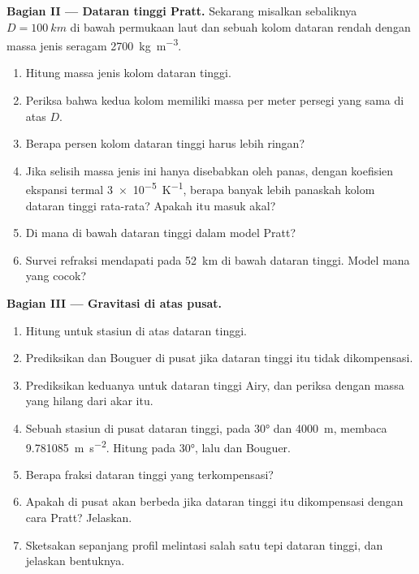 \begin{problem}
\noindent\textbf{Bagian II --- Dataran tinggi Pratt.}
Sekarang misalkan sebaliknya  $D = \qty{100}{km}$ di bawah permukaan laut dan sebuah kolom dataran rendah dengan massa jenis seragam \qty{2700}{kg.m^{-3}}.
\begin{enumerate}[resume]
  \item Hitung massa jenis kolom dataran tinggi.
  \item Periksa bahwa kedua kolom memiliki massa per meter persegi yang sama di atas $D$.
  \item Berapa persen kolom dataran tinggi harus lebih ringan?
  \item Jika selisih massa jenis ini hanya disebabkan oleh panas, dengan koefisien ekspansi termal \qty{3e-5}{K^{-1}}, berapa banyak lebih panaskah kolom dataran tinggi rata-rata? Apakah itu masuk akal?
  \item Di mana  di bawah dataran tinggi dalam model Pratt?
  \item Survei refraksi mendapati  pada \qty{52}{km} di bawah dataran tinggi. Model mana yang cocok?
\end{enumerate}

\noindent\textbf{Bagian III --- Gravitasi di atas pusat.}
\begin{enumerate}[resume]
  \item Hitung  untuk stasiun di atas dataran tinggi.
  \item Prediksikan  dan Bouguer di pusat jika dataran tinggi itu tidak dikompensasi.
  \item Prediksikan keduanya untuk dataran tinggi Airy, dan periksa  dengan massa yang hilang dari akar itu.
  \item Sebuah stasiun di pusat dataran tinggi, pada  \ang{30} dan \qty{4000}{m}, membaca \qty{9.781085}{m.s^{-2}}. Hitung  pada \ang{30}, lalu  dan Bouguer.
  \item Berapa fraksi dataran tinggi yang terkompensasi?
  \item Apakah  di pusat akan berbeda jika dataran tinggi itu dikompensasi dengan cara Pratt? Jelaskan.
  \item Sketsakan  sepanjang profil melintasi salah satu tepi dataran tinggi, dan jelaskan bentuknya.
\end{enumerate}


\end{problem}
